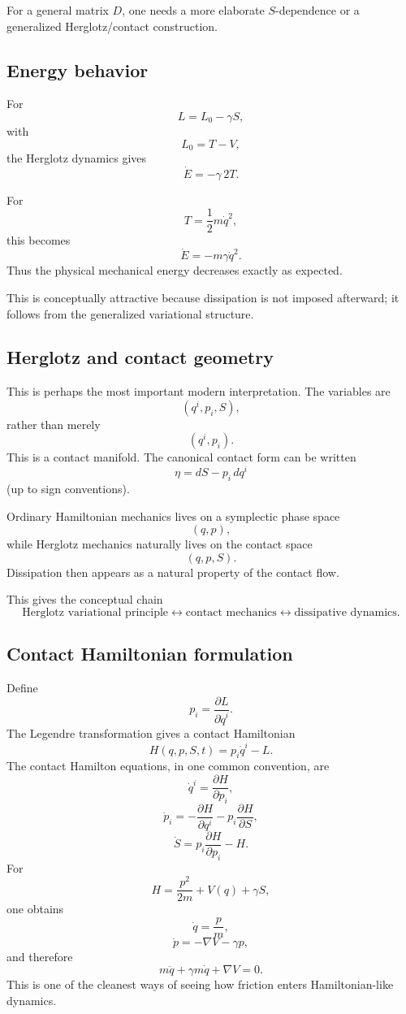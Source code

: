 For a general matrix \(D\), one needs a more elaborate \(S\)-dependence or a generalized Herglotz/contact construction.

\subsection{Energy behavior}

For $$ L=L_0-\gamma S, $$ with $$ L_0=T-V, $$
the Herglotz dynamics gives $$ \dot E=-\gamma\,2T. $$

For $$ T=\frac12m\dot q^2, $$
this becomes
$$ \boxed{ \dot E=-m\gamma\dot q^2. } $$
Thus the physical mechanical energy decreases exactly as expected.

This is conceptually attractive because dissipation is not imposed afterward; it follows from the generalized variational structure.

\subsection{Herglotz and contact geometry}

This is perhaps the most important modern interpretation.
The variables are $$ (q^i,p_i,S), $$
rather than merely $$ (q^i,p_i). $$
This is a contact manifold.
The canonical contact form can be written
$$ \boxed{ \eta=dS-p_i\,dq^i } $$
(up to sign conventions).

Ordinary Hamiltonian mechanics lives on a symplectic phase space
$$ (q,p), $$
while Herglotz mechanics naturally lives on the contact space
$$ (q,p,S). $$
Dissipation then appears as a natural property of the contact flow.

This gives the conceptual chain
$$ \boxed{ \text{Herglotz variational principle} \longleftrightarrow \text{contact mechanics} \longleftrightarrow \text{dissipative dynamics}. } $$

\subsection{Contact Hamiltonian formulation}

Define $$ p_i=\frac{\partial L}{\partial\dot q^i}. $$
The Legendre transformation gives a contact Hamiltonian
$$ \boxed{ H(q,p,S,t) = p_i\dot q^i-L. } $$
The contact Hamilton equations, in one common convention, are
$$ \dot q^i = \frac{\partial H}{\partial p_i}, $$ 
$$ \dot p_i = -\frac{\partial H}{\partial q^i} -p_i\frac{\partial H}{\partial S}, $$ 
$$ \dot S = p_i\frac{\partial H}{\partial p_i}-H. $$
For $$ H= \frac{p^2}{2m}+V(q)+\gamma S, $$
one obtains
$$ \dot q=\frac{p}{m}, $$ $$ \dot p=-\nabla V-\gamma p, $$
and therefore
$$ \boxed{ m\ddot q+\gamma m\dot q+\nabla V=0. } $$
This is one of the cleanest ways of seeing how friction enters Hamiltonian-like dynamics.

